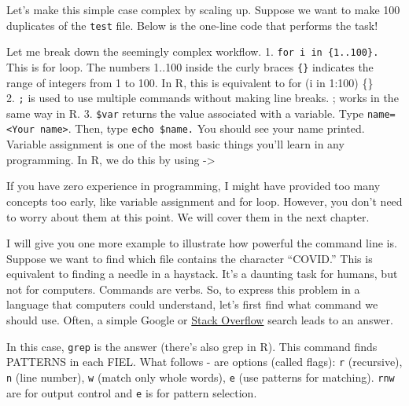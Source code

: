\documentclass[
]{book}
\newenvironment{Shaded}{\begin{snugshade}}{\end{snugshade}}
\newcommand{\DataTypeTok}[1]{\textcolor[rgb]{0.13,0.29,0.53}{#1}}
\newcommand{\ExtensionTok}[1]{#1}
\newcommand{\FunctionTok}[1]{\textcolor[rgb]{0.00,0.00,0.00}{#1}}
\newcommand{\KeywordTok}[1]{\textcolor[rgb]{0.13,0.29,0.53}{\textbf{#1}}}
\newcommand{\NormalTok}[1]{#1}
\newcommand{\StringTok}[1]{\textcolor[rgb]{0.31,0.60,0.02}{#1}}
\newcommand{\VariableTok}[1]{\textcolor[rgb]{0.00,0.00,0.00}{#1}}
\begin{document}
Let's make this simple case complex by scaling up. Suppose we want to make 100 duplicates of the \texttt{test} file. Below is the one-line code that performs the task!

\begin{Shaded}
\end{Shaded}

Let me break down the seemingly complex workflow.
1. \texttt{for\ i\ in\ \{1..100\}.} This is for loop. The numbers 1..100 inside the curly braces \texttt{\{\}} indicates the range of integers from 1 to 100. In R, this is equivalent to for (i in 1:100) \{\}\\
2. \texttt{;} is used to use multiple commands without making line breaks. ; works in the same way in R.
3. \texttt{\$var} returns the value associated with a variable. Type \texttt{name=\textless{}Your\ name\textgreater{}}. Then, type \texttt{echo\ \$name.} You should see your name printed. Variable assignment is one of the most basic things you'll learn in any programming. In R, we do this by using -\textgreater{}

If you have zero experience in programming, I might have provided too many concepts too early, like variable assignment and for loop. However, you don't need to worry about them at this point. We will cover them in the next chapter.

I will give you one more example to illustrate how powerful the command line is. Suppose we want to find which file contains the character ``COVID.'' This is equivalent to finding a needle in a haystack. It's a daunting task for humans, but not for computers. Commands are verbs. So, to express this problem in a language that computers could understand, let's first find what command we should use. Often, a simple Google or \href{https://stackoverflow.com/}{Stack Overflow} search leads to an answer.

In this case, \texttt{grep} is the answer (there's also grep in R). This command finds PATTERNS in each FIEL. What follows - are options (called flags): \texttt{r} (recursive), \texttt{n} (line number), \texttt{w} (match only whole words), \texttt{e} (use patterns for matching). \texttt{rnw} are for output control and \texttt{e} is for pattern selection.
\end{document}
